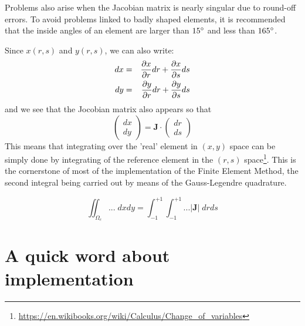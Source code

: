 \begin{remark}
Problems also arise when the Jacobian matrix is nearly singular due to round-off errors.
To avoid problems linked to badly shaped elements, it is recommended that the inside
angles of an element are larger than $15\degree$ and less than $165\degree$.
\end{remark}

Since $x(r,s)$ and $y(r,s)$, we can also write:
\begin{eqnarray}
dx &=& \frac{\partial x}{\partial r} dr + \frac{\partial x}{\partial s} ds \nonumber\\
dy &=& \frac{\partial y}{\partial r} dr + \frac{\partial y}{\partial s} ds \nonumber
\end{eqnarray}
and we see that the Jocobian matrix also appears so that 
\begin{equation}
\left(
\begin{array}{c}
dx \\ dy
\end{array}
\right)
={\bm J}\cdot
\left(
\begin{array}{c}
dr \\ ds
\end{array}
\right)
\end{equation}
This means that integrating over the 'real' element in $(x,y)$ space
can be simply done by integrating of the reference element in the 
$(r,s)$ space\footnote{\url{https://en.wikibooks.org/wiki/Calculus/Change_of_variables}}. 
This is the cornerstone of most of the implementation of the 
Finite Element Method, the second integral being carried out by means 
of the Gauss-Legendre quadrature.

\begin{equation}
\iint_{\Omega_e} ... \; dx dy = \int_{-1}^{+1} \int_{-1}^{+1} ...|{\bm J}| \; dr ds
\end{equation}


\section{A quick word about implementation}

